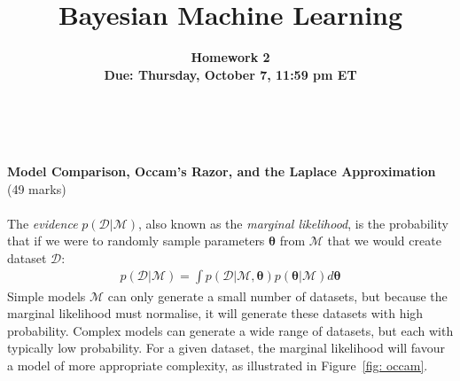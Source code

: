 \documentclass[11pt]{article}
\title{\vspace{-20mm} Bayesian Machine Learning}
\date{}
\author{
\textbf{Homework 2}  \\ \textbf{Due: Thursday, October 7, 11:59 pm ET}}
\newcommand{\mbf}[1]{{\boldsymbol{\mathbf{#1}}}}
\renewcommand{\bm}{\mbf}
\begin{document}
\maketitle

\

\textbf{Model Comparison, Occam's Razor, and the Laplace Approximation} \\
(49 marks) \\ \\

The \emph{evidence} $p(\mathcal{D}|\mathcal{M})$, also known as the \emph{marginal likelihood}, is the probability that if we were to randomly sample parameters $\bm{\theta}$ from $\mathcal{M}$ that we would create dataset $\mathcal{D}$: 
\begin{align}
p(\mathcal{D} | \mathcal{M}) = \int p(\mathcal{D} | \mathcal{M}, \bm{\theta}) p(\bm{\theta} | \mathcal{M}) d\bm{\theta}
\label{eqn: evidence}
\end{align}
Simple models $\mathcal{M}$ can only generate a small number
of datasets, but because the marginal likelihood must normalise, it will generate these datasets with
high probability. Complex models can generate a wide range of datasets, but each with typically low
probability. For a given dataset, the marginal likelihood will favour a model of more appropriate
complexity, as illustrated in Figure~\ref{fig: occam}.
\end{document}
